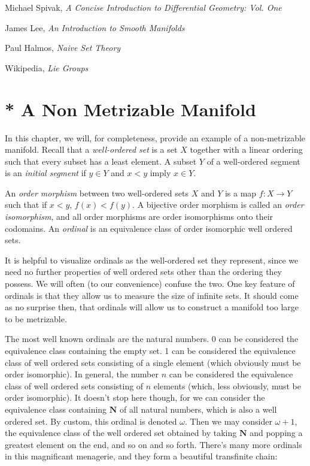 \begin{thebibliography}{10}
     Michael Spivak,
    \emph{A Concise Introduction to Differential Geometry: Vol. One}

     James Lee,
    \emph{An Introduction to Smooth Manifolds}

     Paul Halmos,
    \emph{Naive Set Theory}

     Wikipedia,
    \emph{Lie Groups}
\end{thebibliography}













\section{* A Non Metrizable Manifold}

In this chapter, we will, for completeness, provide an example of a non-metrizable manifold. Recall that a \emph{well-ordered set} is a set $X$ together with a linear ordering such that every subset has a least element. A subset $Y$ of a well-ordered segment is an \emph{initial segment} if $y \in Y$ and $x < y$ imply $x \in Y$.

\begin{definition}
    An \emph{order morphism} between two well-ordered sets $X$ and $Y$ is a map $f:X \to Y$ such that if $x < y$, $f(x) < f(y)$. A bijective order morphism is called an \emph{order isomorphism}, and all order morphisms are order isomorphisms onto their codomains. An \emph{ordinal} is an equivalence class of order isomorphic well ordered sets.
\end{definition}

It is helpful to visualize ordinals as the well-ordered set they represent, since we need no further properties of well ordered sets other than the ordering they possess. We will often (to our convenience) confuse the two. One key feature of ordinals is that they allow us to measure the size of infinite sets. It should come as no surprise then, that ordinals will allow us to construct a manifold too large to be metrizable.

The most well known ordinals are the natural numbers. 0 can be considered the equivalence class containing the empty set. 1 can be considered the equivalence class of well ordered sets consisting of a single element (which obviously must be order isomorphic). In general, the number $n$ can be considered the equivalence class of well ordered sets consisting of $n$ elements (which, less obviously, must be order isomorphic). It doesn't stop here though, for we can consider the equivalence class containing $\mathbf{N}$ of all natural numbers, which is also a well ordered set. By custom, this ordinal is denoted $\omega$. Then we may consider $\omega + 1$, the equivalence class of the well ordered set obtained by taking $\mathbf{N}$ and popping a greatest element on the end, and so on and so forth. There's many more ordinals in this magnificant menagerie, and they form a beautiful transfinite chain:

